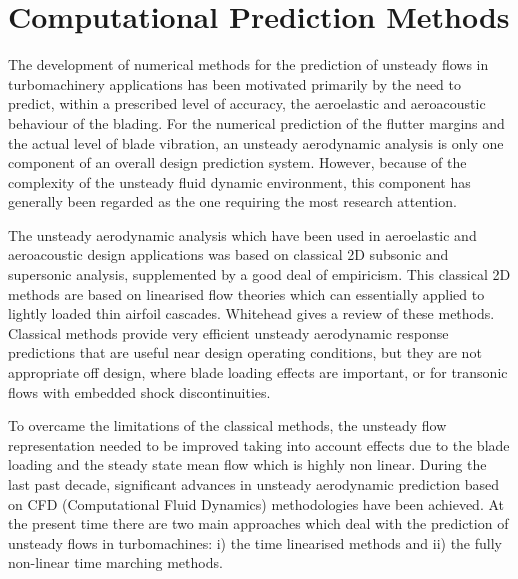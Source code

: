 %
%
%
%
\section{Computational Prediction Methods}
\label{prediction_methods.sec}
%
%
 The development of numerical methods for the prediction of unsteady
 flows in turbomachinery applications has been motivated primarily
 by the need to predict, within a prescribed level of accuracy, the
 aeroelastic and aeroacoustic behaviour of the blading.
 For the numerical prediction of the flutter margins and the actual
 level of blade vibration, an unsteady aerodynamic analysis is only
 one component of an overall design prediction system. However, because
 of the complexity of the unsteady fluid dynamic environment, this
 component has generally been regarded as the one requiring the
 most research attention.

 The unsteady aerodynamic analysis which have been used in aeroelastic and
 aeroacoustic design applications was based on classical 2D subsonic
 and supersonic analysis, supplemented by a good deal of empiricism.
 This classical 2D methods are based on linearised
 flow theories which can essentially applied to lightly loaded thin
 airfoil cascades.
 Whitehead \citeyear{Whitehead:1} gives a review of these
 methods. Classical methods provide very efficient unsteady aerodynamic
 response predictions that are useful near design operating conditions,
 but they are not appropriate
 off design, where blade loading effects are important, or for transonic flows
 with embedded shock discontinuities.

 To overcame the limitations of the classical methods, the unsteady
 flow representation needed to be improved taking into account effects due to
 the blade loading and the steady state mean flow which is highly non linear.
 During the last past decade, significant advances in unsteady
 aerodynamic prediction based on CFD (Computational Fluid Dynamics)
 methodologies have been achieved.
 At the present time there are two main approaches which deal with the
 prediction of unsteady flows in turbomachines:
 i) the time linearised methods and ii) the
 fully non-linear time marching methods.
%
%
%
